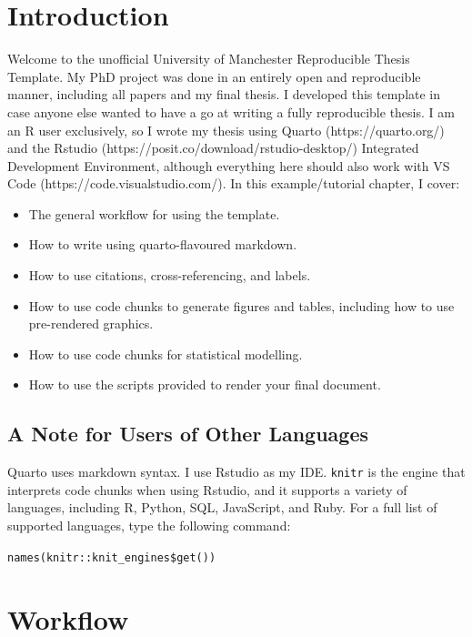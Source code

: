 \documentclass[../main.tex]{subfiles}
\begin{document}
\section{Introduction}\label{introduction}

Welcome to the unofficial University of Manchester Reproducible Thesis
Template. My PhD project was done in an entirely open and reproducible
manner, including all papers and my final thesis. I developed this
template in case anyone else wanted to have a go at writing a fully
reproducible thesis. I am an R user exclusively, so I wrote my thesis
using Quarto (https://quarto.org/) and the Rstudio
(https://posit.co/download/rstudio-desktop/) Integrated Development
Environment, although everything here should also work with VS Code
(https://code.visualstudio.com/). In this example/tutorial chapter, I
cover:

\begin{itemize}
\tightlist
\item
  The general workflow for using the template.
\item
  How to write using quarto-flavoured markdown.
\item
  How to use citations, cross-referencing, and labels.
\item
  How to use code chunks to generate figures and tables, including how
  to use pre-rendered graphics.
\item
  How to use code chunks for statistical modelling.
\item
  How to use the scripts provided to render your final document.
\end{itemize}

\subsection{A Note for Users of Other
Languages}\label{a-note-for-users-of-other-languages}

Quarto uses markdown syntax. I use Rstudio as my IDE. \texttt{knitr} is
the engine that interprets code chunks when using Rstudio, and it
supports a variety of languages, including R, Python, SQL, JavaScript,
and Ruby. For a full list of supported languages, type the following
command:

\texttt{names(knitr::knit\_engines\$get())}

\section{Workflow}\label{workflow}
\end{document}

